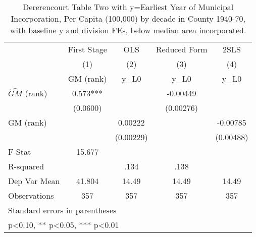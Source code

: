 \begin{table}[htbp]\centering
\def\sym#1{\ifmmode^{#1}\else\(^{#1}\)\fi}
\caption{Dererencourt Table Two with y=Earliest Year of Municipal Incorporation, Per Capita (100,000) by decade in County 1940-70, with baseline y and division FEs, below median area incorporated.}
\begin{tabular}{l*{4}{c}}
\toprule
                    & First Stage   &         OLS   &Reduced Form   &        2SLS   \\
                    &\multicolumn{1}{c}{(1)}&\multicolumn{1}{c}{(2)}&\multicolumn{1}{c}{(3)}&\multicolumn{1}{c}{(4)}\\
                    &\multicolumn{1}{c}{GM  (rank)}&\multicolumn{1}{c}{y\_L0}&\multicolumn{1}{c}{y\_L0}&\multicolumn{1}{c}{y\_L0}\\
\midrule
$\hat{GM}$ (rank)   &       0.573***&               &    -0.00449   &               \\
                    &    (0.0600)   &               &   (0.00276)   &               \\
\addlinespace
GM  (rank)          &               &     0.00222   &               &    -0.00785   \\
                    &               &   (0.00229)   &               &   (0.00488)   \\
\midrule
F-Stat              &      15.677   &               &               &               \\
R-squared           &               &        .134   &        .138   &               \\
Dep Var Mean        &      41.804   &       14.49   &       14.49   &       14.49   \\
Observations        &         357   &         357   &         357   &         357   \\
\bottomrule
\multicolumn{5}{l}{\footnotesize Standard errors in parentheses}\\
\multicolumn{5}{l}{\footnotesize * p<0.10, ** p<0.05, *** p<0.01}\\
\end{tabular}
\end{table}
